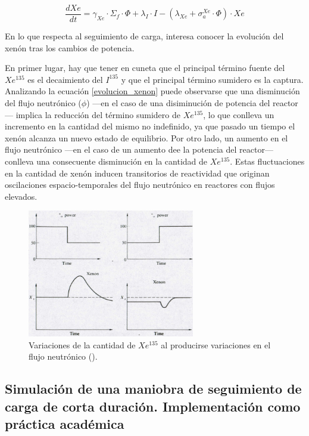 \begin{equation} \label{evolucion_xenon}
  \frac{d X e}{d t}=\gamma_{X e} \cdot \Sigma_f \cdot \Phi+\lambda_I \cdot I-\left(\lambda_{X e}+\sigma_a^{X e} \cdot \Phi\right) \cdot X e
\end{equation}

En lo que respecta al seguimiento de carga, interesa conocer la evolución del xenón tras los cambios de potencia. 

En primer lugar, hay que tener en cuneta que el principal término fuente del $Xe^{135}$ es el decaimiento del $I^{135}$ y que el principal término sumidero es la captura. Analizando la ecuación \ref{evolucion_xenon} puede observarse que una disminución del flujo neutrónico ($\phi$) ---en el caso de una disiminución de potencia del reactor--- implica la reducción del término sumidero de  $Xe^{135}$, lo que conlleva un incremento en la cantidad del mismo no indefinido, ya que pasado un tiempo el xenón alcanza un nuevo estado de equilibrio. Por otro lado, un aumento en el flujo neutrónico ---en el caso de un aumento dee la potencia del reactor--- conlleva una consecuente disminución en la cantidad de $Xe^{135}$. Estas fluctuaciones en la cantidad de xenón inducen transitorios de reactividad que
originan oscilaciones espacio-temporales del flujo neutrónico en reactores con flujos elevados.

\begin{figure}[h]
  \centering
  \includegraphics[width=0.65\textwidth]{content/figures/variaciones_potencia_xenon.png}
  \caption{Variaciones de la cantidad de $Xe^{135}$ al producirse variaciones en el flujo neutrónico (\cite{apuntes_centrales}).}
  \label{fig:variaciones_potencia_xenon}
\end{figure}

\subsection{Simulación de una maniobra de seguimiento de carga de corta duración. Implementación como práctica académica}

